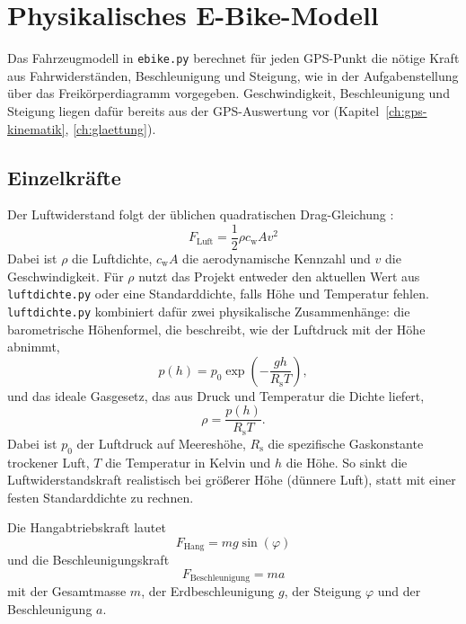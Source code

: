 \chapter{Physikalisches E-Bike-Modell}
\label{ch:physik}

Das Fahrzeugmodell in \texttt{ebike.py} berechnet für jeden GPS-Punkt die nötige Kraft aus Fahrwiderständen, Beschleunigung und Steigung, wie in der Aufgabenstellung über das Freikörperdiagramm vorgegeben. Geschwindigkeit, Beschleunigung und Steigung liegen dafür bereits aus der GPS-Auswertung vor (Kapitel~\ref{ch:gps-kinematik}, \ref{ch:glaettung}).

\section{Einzelkräfte}

Der Luftwiderstand folgt der üblichen quadratischen Drag-Gleichung \cite{nasa_drag}:
\begin{equation}
F_{\mathrm{Luft}} = \frac{1}{2}\rho c_{\mathrm{w}}A v^2
\end{equation}
Dabei ist \(\rho\) die Luftdichte, \(c_{\mathrm{w}}A\) die aerodynamische Kennzahl und \(v\) die Geschwindigkeit. Für \(\rho\) nutzt das Projekt entweder den aktuellen Wert aus \texttt{luftdichte.py} oder eine Standarddichte, falls Höhe und Temperatur fehlen. \texttt{luftdichte.py} kombiniert dafür zwei physikalische Zusammenhänge: die barometrische Höhenformel, die beschreibt, wie der Luftdruck mit der Höhe abnimmt,
\begin{equation}
p(h) = p_0 \exp\!\left(-\frac{g h}{R_{\mathrm{s}} T}\right),
\end{equation}
und das ideale Gasgesetz, das aus Druck und Temperatur die Dichte liefert,
\begin{equation}
\rho = \frac{p(h)}{R_{\mathrm{s}} T}.
\end{equation}
Dabei ist \(p_0\) der Luftdruck auf Meereshöhe, \(R_{\mathrm{s}}\) die spezifische Gaskonstante trockener Luft, \(T\) die Temperatur in Kelvin und \(h\) die Höhe. So sinkt die Luftwiderstandskraft realistisch bei größerer Höhe (dünnere Luft), statt mit einer festen Standarddichte zu rechnen.

Die Hangabtriebskraft lautet
\begin{equation}
F_{\mathrm{Hang}} = m g \sin(\varphi)
\end{equation}
und die Beschleunigungskraft
\begin{equation}
F_{\mathrm{Beschleunigung}} = m a
\end{equation}
mit der Gesamtmasse \(m\), der Erdbeschleunigung \(g\), der Steigung \(\varphi\) und der Beschleunigung \(a\).

